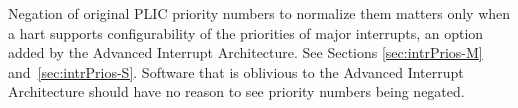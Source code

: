 \begin{commentary}
Negation of original PLIC priority numbers to normalize them matters
only when a hart supports configurability of the priorities of major
interrupts, an option added by the Advanced Interrupt Architecture.
See Sections \ref{sec:intrPrios-M} and~\ref{sec:intrPrios-S}.
Software that is oblivious to the Advanced Interrupt Architecture
should have no reason to see priority numbers being negated.
\end{commentary}

